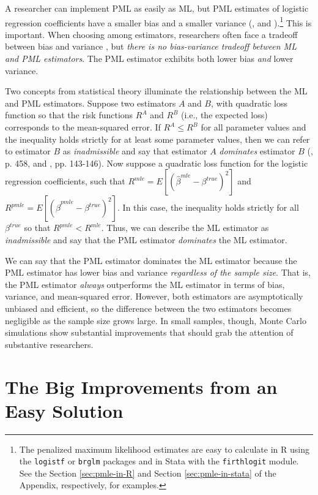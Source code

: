 \documentclass[12pt]{article}
\begin{document}
A researcher can implement PML as easily as ML, but PML estimates of logistic regression coefficients have a smaller bias \citep{Firth1993} and a smaller variance (\citealt[p. 49]{Kosmidis2007}, and \citealt{Copas1988}).\footnote{The penalized maximum likelihood estimates are easy to calculate in R using the \texttt{logistf} or \texttt{brglm} packages and in Stata with the \texttt{firthlogit} module. 
See the Section \ref{sec:pmle-in-R} and Section \ref{sec:pmle-in-stata} of the Appendix, respectively, for examples.}
This is important.
When choosing among estimators, researchers often face a tradeoff between bias and variance \citep[pp. 37-38]{HastieTibshiraniFriedman2013}, but \textit{there is no bias-variance tradeoff between ML and PML estimators}.
The PML estimator exhibits both lower bias \textit{and} lower variance.

Two concepts from statistical theory illuminate the relationship between the ML and PML estimators. 
Suppose two estimators $A$ and $B$, with quadratic loss function so that the risk functions $R^A$ and $R^B$ (i.e., the expected loss) corresponds to the mean-squared error. 
If $R^A \leq R^B$ for all parameter values and the inequality holds strictly for at least some parameter values, then we can refer to estimator $B$ as \textit{inadmissible} and say that estimator $A$ \textit{dominates} estimator $B$ (\citealt{DeGrootSchervish2012}, p. 458, and \citealt{LeonardHsu1999}, pp. 143-146). 
Now suppose a quadratic loss function for the logistic regression coefficients, such that $R^{mle} = E[(\hat{\beta}^{mle} - \beta^{true})^2]$ and $R^{pmle} = E[(\hat{\beta}^{pmle} - \beta^{true})^2]$. 
In this case, the inequality holds strictly for all $\beta^{true}$ so that $R^{pmle} < R^{mle}$. Thus, we can describe the ML estimator as \textit{inadmissible} and say that the PML estimator \textit{dominates} the ML estimator.

We can say that the PML estimator dominates the ML estimator because the PML estimator has lower bias and variance \textit{regardless of the sample size}. 
That is, the PML estimator \textit{always} outperforms the ML estimator in terms of bias, variance, and mean-squared error.
However, both estimators are asymptotically unbiased and efficient, so the difference between the two estimators becomes negligible as the sample size grows large.
In small samples, though, Monte Carlo simulations show substantial improvements that should grab the attention of substantive researchers.

\section*{The Big Improvements from an Easy Solution}
\end{document}

